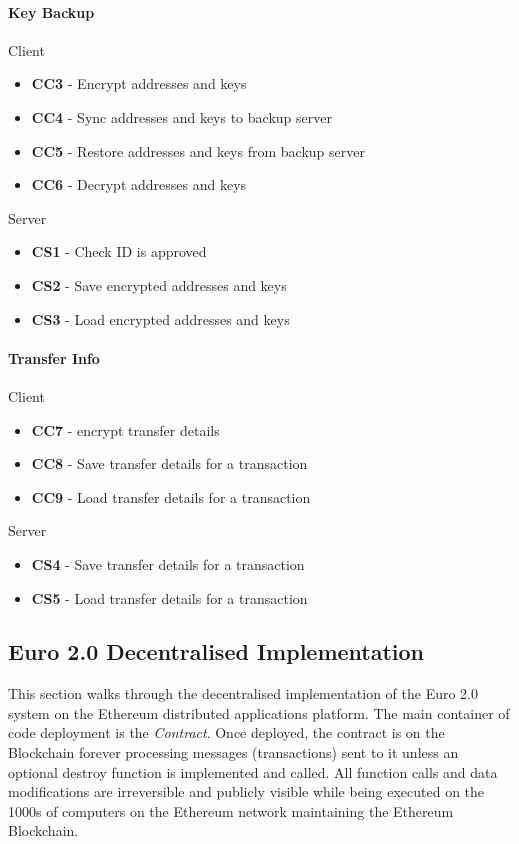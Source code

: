 \documentclass[12pt]{article} %
\begin{document}
{{\paragraph{Key Backup}

Client
\begin{itemize}
	\item \textbf{CC3} - Encrypt addresses and keys
	\item \textbf{CC4} - Sync addresses and keys to backup server
	\item \textbf{CC5} - Restore addresses and keys from backup server
	\item \textbf{CC6} - Decrypt addresses and keys
\end{itemize}

Server
\begin{itemize}
	\item \textbf{CS1} - Check ID is approved
	\item \textbf{CS2} - Save encrypted addresses and keys
	\item \textbf{CS3} - Load encrypted addresses and keys
\end{itemize}

\paragraph{Transfer Info}

Client
\begin{itemize}
	\item \textbf{CC7} - encrypt transfer details
	\item \textbf{CC8} - Save transfer details for a transaction
	\item \textbf{CC9} - Load transfer details for a transaction
\end{itemize}

Server
\begin{itemize}
	\item \textbf{CS4} - Save transfer details for a transaction
	\item \textbf{CS5} - Load transfer details for a transaction
\end{itemize}


\subsection{Euro 2.0 Decentralised Implementation} \label{ssec:3.4}

This section walks through the decentralised implementation of the Euro 2.0 system on the Ethereum distributed applications platform. The main container of code deployment is the \textit{Contract}. Once deployed, the contract is on the Blockchain forever processing messages (transactions) sent to it unless an optional destroy function is implemented and called. All function calls and data modifications are irreversible and publicly visible while being executed on the 1000s of computers on the Ethereum network maintaining the Ethereum Blockchain.

}}
\end{document}
